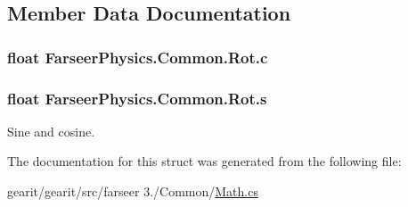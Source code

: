 \subsection{Member Data Documentation}
\hypertarget{struct_farseer_physics_1_1_common_1_1_rot_a521f461427cd34267811c55f18e83560}{
\subsubsection[{c}]{\setlength{\rightskip}{0pt plus 5cm}float Farseer\+Physics.\+Common.\+Rot.\+c}}\label{struct_farseer_physics_1_1_common_1_1_rot_a521f461427cd34267811c55f18e83560}
\hypertarget{struct_farseer_physics_1_1_common_1_1_rot_ae6fb8654f71e0eff787280755b3d05f7}{
\subsubsection[{s}]{\setlength{\rightskip}{0pt plus 5cm}float Farseer\+Physics.\+Common.\+Rot.\+s}}\label{struct_farseer_physics_1_1_common_1_1_rot_ae6fb8654f71e0eff787280755b3d05f7}


Sine and cosine. 



The documentation for this struct was generated from the following file\+:\begin{DoxyCompactItemize}
\item 
gearit/gearit/src/farseer 3./\+Common/\hyperlink{_math_8cs}{Math.\+cs}\end{DoxyCompactItemize}
